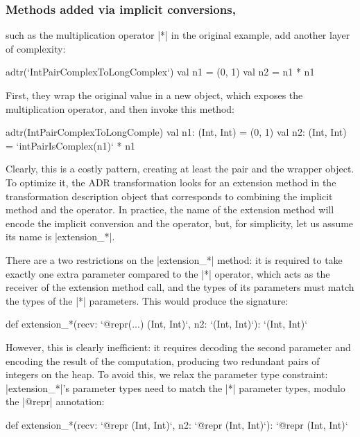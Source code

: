 \subsubsection{Methods added via implicit conversions,} such as the multiplication operator |*| in the original example, add another layer of complexity:

\begin{lstlisting-nobreak}
adtr(`IntPairComplexToLongComplex`) {
  val n1 = (0, 1)
  val n2 = n1 * n1
}
\end{lstlisting-nobreak}

First, they wrap the original value in a new object, which exposes the multiplication operator, and then invoke this method:

\begin{lstlisting-nobreak}
adtr(IntPairComplexToLongComple) {
  val n1: (Int, Int) = (0, 1)
  val n2: (Int, Int) = `intPairIsComplex(n1)` * n1
}
\end{lstlisting-nobreak}

Clearly, this is a costly pattern, creating at least the pair and the wrapper object. To optimize it, the ADR transformation looks for an extension method in the transformation description object that corresponds to combining the implicit method and the operator. In practice, the name of the extension method will encode the implicit conversion and the operator, but, for simplicity, let us assume its name is |extension_*|.

There are a two restrictions on the |extension_*| method: it is required to take exactly one extra parameter compared to the |*| operator, which acts as the receiver of the extension method call, and the types of its parameters must match the types of the |*| parameters. This would produce the signature:

\begin{lstlisting-nobreak}
def extension_*(recv: `@repr(...) (Int, Int)`, n2: `(Int, Int)`): `(Int, Int)`
\end{lstlisting-nobreak}

However, this is clearly inefficient: it requires decoding the second parameter and encoding the result of the computation, producing two redundant pairs of integers on the heap. To avoid this, we relax the parameter type constraint: |extension_*|'s parameter types need to match the |*| parameter types, modulo the |@repr| annotation:

\begin{lstlisting-nobreak}
def extension_*(recv: `@repr (Int, Int)`,  n2: `@repr (Int, Int)`): `@repr (Int, Int)`
\end{lstlisting-nobreak}

